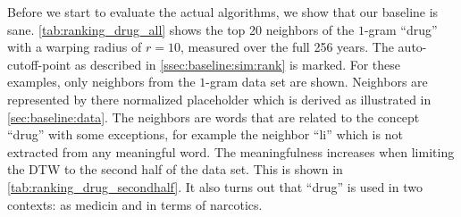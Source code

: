 Before we start to evaluate the actual algorithms, we show that our baseline is sane. \autoref{tab:ranking_drug_all} shows the top \num{20} neighbors of the $1$-gram \enquote{drug} with a warping radius of $r = 10$, measured over the full \num{256} years. The auto-cutoff-point as described in \autoref{ssec:baseline:sim:rank} is marked. For these examples, only neighbors from the $1$-gram data set are shown. Neighbors are represented by there normalized placeholder which is derived as illustrated in \autoref{sec:baseline:data}. The neighbors are words that are related to the concept \enquote{drug} with some exceptions, for example the neighbor \enquote{li} which is not extracted from any meaningful word. The meaningfulness increases when limiting the DTW to the second half of the data set. This is shown in \autoref{tab:ranking_drug_secondhalf}. It also turns out that \enquote{drug} is used in two contexts: as medicin and in terms of narcotics.

